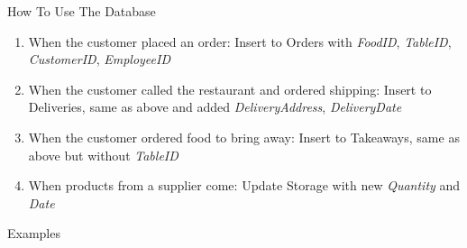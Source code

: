 \documentclass[14pt, c]{beamer}
\begin{document}
\begin{frame}[label=sec-1-5]{How To Use The Database}
\begin{block}{}
\begin{enumerate}
\item \small{}When the customer placed an order: Insert to \alert{Orders} with \emph{FoodID}, \emph{TableID}, \emph{CustomerID}, \emph{EmployeeID}
\item \small{}When the customer called the restaurant and ordered shipping: Insert to \alert{Deliveries}, same as above and added \emph{DeliveryAddress}, \emph{DeliveryDate}
\item \small{}When the customer ordered food to bring away: Insert to \alert{Takeaways}, same as above but without \emph{TableID}
\item \small{}When products from a supplier come: Update \alert{Storage} with new \emph{Quantity} and \emph{Date}
\end{enumerate}
\end{block}
\end{frame}

\begin{frame}[label=sec-1-6]{}
\begin{block}{}
\begin{center}
\huge{}Examples
\end{center}
\end{block}
\end{frame}
\end{document}
